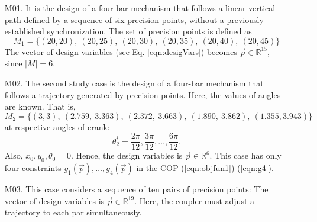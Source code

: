 \documentclass[12pt,letterpape]{article}
\begin{document}
\begin{itemize}

\item[M01.] It is the design of a four-bar mechanism that follows a linear vertical path
defined by a sequence of six precision points, without a previously established
synchronization. The set of precision points is defined as
% 
$$
	M_{1} = \{ (20, 20),\ (20, 25),\ (20, 30),\ (20, 35),\ (20, 40),\ (20, 45) \}
$$
The vector of design variables (see Eq. \ref{eqn:desigVars}) becomes $ \vec{p} \in \mathbb{R}^{15} $, since $|M| = 6$. 
%
%
\item[M02.] The second study case is the design of a four-bar mechanism that follows
a trajectory generated by precision points. Here, the values of angles are known.
That is,
% 
$$
	M_{2} = \{(3, 3),\ (2.759,\ 3.363),\ (2.372,\ 3.663),\ (1.890,\ 3.862),\ (1.355, 3.943) \}
$$
% 
at respective angles of crank:
$$
	\theta_2^i = \dfrac{2\pi}{12}, \dfrac{3\pi}{12}, \ldots,\dfrac{6\pi}{12}.
$$
% 
Also, $x_0, y_0, \theta_0 = 0$. Hence, the design variables is $\vec{p} \in \mathbb{R}^6$.
This case has only four constraints $g_1(\vec{p}), \ldots, g_4(\vec{p})$ in the
COP (\ref{eqn:objfun1})-(\ref{eqn:g4}).


% 


\item[M03.] This case considers a sequence of ten pairs of precision points:
The vector of design variables is $ \vec{p} \in \mathbb{R}^{19} $. Here, the coupler
must adjust a trajectory to each par simultaneously.


\end{itemize}
\end{document}
